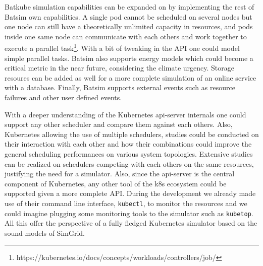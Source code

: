 Batkube simulation capabilities can be expanded on by implementing the rest of
Batsim own capabilities. A single pod cannot be scheduled on several nodes but
one node can still have a theoretically unlimited capacity in resources, and
pods inside one same node can communicate with each others and work together to
execute a parallel
task\footnote{https://kubernetes.io/docs/concepts/workloads/controllers/job/}.
With a bit of tweaking in the API one could model simple parallel tasks. Batsim
also supports energy models which could become a critical metric in the near
future, considering the climate urgency. Storage resoures can be added as well
for a more complete simulation of an online service with a database. Finally,
Batsim supports external events such as resource failures and other user
defined events.

With a deeper understanding of the Kubernetes api-server internals one could
support any other scheduler and compare them against each others. Also,
Kubernetes allowing the use of multiple schedulers, studies could be conducted
on their interaction with each other and how their combinations could improve
the general scheduling performances on various system topologies. Extensive
studies can be realized on schedulers competing with each others on the same
resources, justifying the need for a simulator. Also, since the api-server is
the central component of Kubernetes, any other tool of the k8s ecosystem could
be supported given a more complete API. During the development we already made
use of their command line interface, \texttt{kubectl}, to monitor the resources
and we could imagine plugging some monitoring tools to the simulator such as
\texttt{kubetop}. All this offer the perspective of a fully fledged Kubernetes
simulator based on the sound models of SimGrid.
